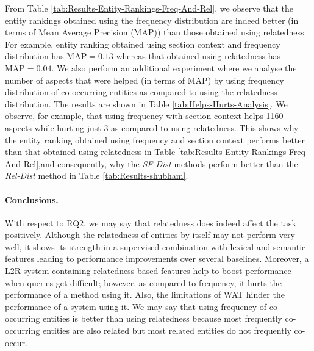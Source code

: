 From Table \ref{tab:Results-Entity-Rankings-Freq-And-Rel}, we observe that the entity rankings obtained using the  frequency distribution are indeed better (in terms of Mean Average Precision (MAP)) than those obtained using relatedness. For example, entity ranking obtained using section context and frequency distribution has $\text{MAP}=0.13$ whereas that obtained using relatedness has $\text{MAP}=0.04$. We also perform an additional experiment where we analyse the number of aspects that were helped (in terms of MAP) by using frequency distribution of co-occurring entities as compared to using the relatedness distribution. The results are shown in Table \ref{tab:Helps-Hurts-Analysis}. We observe, for example, that using frequency with section context helps 1160 aspects while hurting just 3 as compared to using relatedness. This shows why the entity ranking obtained using frequency and section context performs better than that obtained using relatedness in Table \ref{tab:Results-Entity-Rankings-Freq-And-Rel},and consequently, why the \textit{SF-Dist} methods perform better than the \textit{Rel-Dist} method in Table \ref{tab:Results-shubham}.


\paragraph{\textbf{Conclusions.}}
With respect to RQ2, we may say that relatedness does indeed affect the task positively. Although the relatedness of entities by itself may not perform very well, it shows its strength in a supervised combination with lexical and semantic features leading to performance improvements over several baselines. Moreover, a L2R system containing relatedness based features help to boost performance when queries get difficult; however, as compared to frequency, it hurts the performance of a method using it. Also, the limitations of WAT hinder the performance of a system using it. We may say that using frequency of co-occurring entities is better than using relatedness because most frequently co-occurring entities are also related but most related entities do not frequently co-occur.

